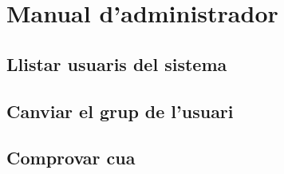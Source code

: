 \chapter*{Manual d'administrador}
\label{cha:adminguide}

\section*{Llistar usuaris del sistema}
\section*{Canviar el grup de l'usuari}
\section*{Comprovar cua}
